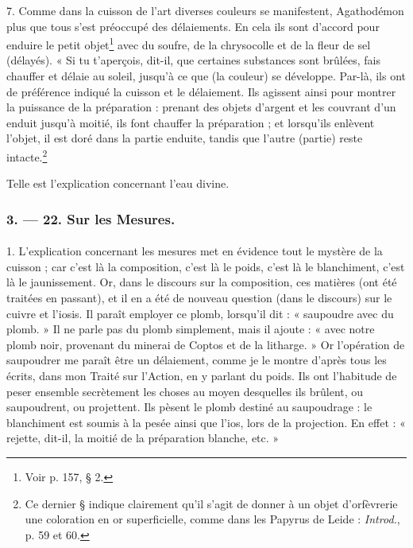 \documentclass[a4paper, 11pt, oneside, polutonikogreek, french]{article}
\begin{document}
7. Comme dans la cuisson de l'art diverses couleurs se manifestent, Agathodémon plus que tous s'est préoccupé des délaiements. En cela ils sont d'accord pour enduire le petit objet\footnote{Voir p. 157, § 2.} avec du soufre, de la chrysocolle et de la fleur de sel (délayés). « Si tu t'aperçois, dit-il, que certaines substances sont brûlées, fais chauffer et délaie au soleil, jusqu'à ce que (la couleur) se développe. Par-là, ils ont de préférence indiqué la cuisson et le délaiement. Ils agissent ainsi pour montrer la puissance de la préparation : prenant des objets d'argent et les couvrant d'un enduit jusqu'à moitié, ils font chauffer la préparation ; et lorsqu'ils enlèvent l'objet, il est doré dans la partie enduite, tandis que l'autre (partie) reste intacte.\footnote{Ce dernier § indique clairement qu'il s'agit de donner à un objet d'orfèvrerie une coloration en or superficielle, comme dans les Papyrus de Leide : \emph{Introd.}, p. 59 et 60.}

Telle est l'explication concernant l'eau divine.

\bigskip
\centerline{\EightStarTaper}
\centerline{\EightStarTaper\EightStarTaper}
\bigskip

\subsubsection{3. --- 22. Sur les Mesures.}
\paragraph{}
1. L'explication concernant les mesures met en évidence tout le mystère de la cuisson ; car c'est là la composition, c'est là le poids, c'est là le blanchiment, c'est là le jaunissement. Or, dans le discours sur la composition, ces matières (ont été traitées en passant), et il en a été de nouveau question (dans le discours) sur le cuivre et l'iosis. Il paraît employer ce plomb, lorsqu'il dit : « saupoudre avec du plomb. » Il ne parle pas du plomb simplement, mais il ajoute : « avec notre plomb noir, provenant du minerai de Coptos et de la litharge. » Or l'opération de saupoudrer me paraît être un délaiement, comme je le montre d'après tous les écrits, dans mon Traité sur l'Action, en y parlant du poids. Ils ont l'habitude de peser ensemble secrètement les choses au moyen desquelles ils brûlent, ou saupoudrent, ou projettent. Ils pèsent le plomb destiné au saupoudrage : le blanchiment est soumis à la pesée ainsi que l'ios, lors de la projection. En effet : « rejette, dit-il, la moitié de la préparation blanche, etc. »
\end{document}
